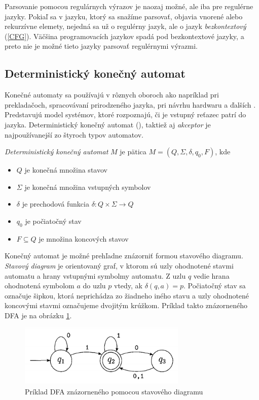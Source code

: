 Parsovanie pomocou regulárnych výrazov je naozaj možné, ale iba pre regulérne jazyky. Pokiaľ sa v jazyku, ktorý sa snažíme parsovať, objavia vnorené alebo rekurzívne elemety, nejedná sa už o regulérny jazyk, ale o jazyk \textit{bezkontextový} (\ref{CFG}). Väčšina programovacích jazykov spadá pod bezkontextové jazyky, a preto nie je možné tieto jazyky parsovať regulérnymi výrazmi.

\subsection{Deterministický konečný automat}\label{DFA}
Konečné automaty sa používajú v rôznych oboroch ako napríklad pri prekladačoch, spracovávaní prirodzeného jazyka, pri návrhu hardwaru a ďalších \cite{demlova:automaty}. Predstavujú model systémov, ktoré rozpoznajú, či je vstupný reťazec patrí do jazyka. Deterministický konečný automat (), taktiež aj \textit{akceptor} je najpoužívanejší zo štyroch typov automatov.

\begin{definice}
\textit{Deterministický konečný automat} $M$ je pätica $M = (Q,\Sigma,\delta, q_0, F)$, kde
\begin{itemize}
\item $Q$ je konečná množina stavov
\item $\Sigma$ je konečná množina vstupných symbolov
\item $\delta$ je prechodová funkcia $\delta: Q \times \Sigma \rightarrow Q$
\item $q_0$ je počiatočný stav
\item $F \subseteq Q$ je množina koncových stavov \cite{demlova:automaty}
\end{itemize}
\end{definice}

Konečný automat je možné prehľadne znázorniť formou stavového diagramu. \textit{Stavový diagram} je orientovaný graf, v ktorom sú uzly ohodnotené stavmi automatu a hrany vstupnými symbolmy automatu. Z uzlu $q$ vedie hrana ohodnotená symbolom $a$ do uzlu $p$ vtedy, ak $\delta(q,a) = p$. Počiatočný stav sa označuje šipkou, ktorá neprichádza zo žiadneho iného stavu a uzly ohodnotené koncovými stavmi označujeme dvojitým krúžkom. Príklad takto znázorneného DFA je na obrázku \ref{fig:DFA_example}.

\begin{figure}[H]
\begin{center}
\includegraphics[width=8cm]{figures/DFA_example.PNG}
\caption{Príklad DFA znázorneného pomocou stavového diagramu}
\label{fig:DFA_example}
\end{center}
\end{figure}

